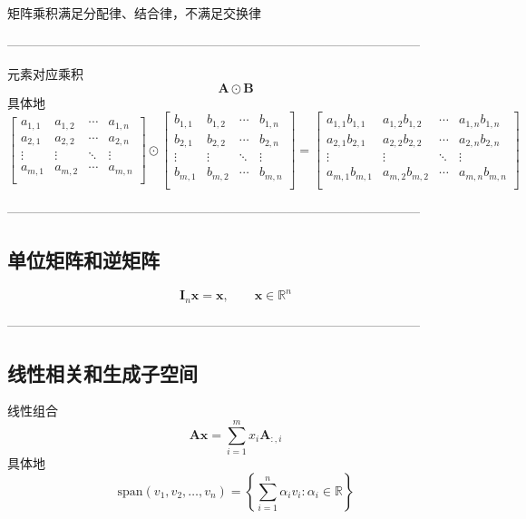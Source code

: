 \documentclass{article}
\begin{document}
矩阵乘积满足分配律、结合律，不满足交换律

--------------------------------------------------------------------------------------------------

元素对应乘积
$$
\mathbf{A} \odot \mathbf{B}
$$
具体地
$$
\begin{bmatrix}
a_{1,1} & a_{1,2} & \cdots & a_{1,n} \\
a_{2,1} & a_{2,2} & \cdots & a_{2,n} \\
\vdots & \vdots & \ddots & \vdots \\
a_{m,1} & a_{m,2} & \cdots & a_{m,n} \\
\end{bmatrix}
\odot
\begin{bmatrix}
b_{1,1} & b_{1,2} & \cdots & b_{1,n} \\
b_{2,1} & b_{2,2} & \cdots & b_{2,n} \\
\vdots & \vdots & \ddots & \vdots \\
b_{m,1} & b_{m,2} & \cdots & b_{m,n} \\
\end{bmatrix}
=
\begin{bmatrix}
a_{1,1} b_{1,1} & a_{1,2} b_{1,2} & \cdots & a_{1,n} b_{1,n} \\
a_{2,1} b_{2,1} & a_{2,2} b_{2,2} & \cdots & a_{2,n} b_{2,n} \\
\vdots & \vdots & \ddots & \vdots \\
a_{m,1} b_{m,1} & a_{m,2} b_{m,2} & \cdots & a_{m,n} b_{m,n} \\
\end{bmatrix}
$$

--------------------------------------------------------------------------------------------------

\subsection{单位矩阵和逆矩阵}
\[
\boldsymbol{I}_n\boldsymbol{x}=\boldsymbol{x}, \qquad \boldsymbol{x} \in \mathbb{R}^n
\]

--------------------------------------------------------------------------------------------------

\subsection{线性相关和生成子空间}
线性组合
$$
\mathbf{Ax} = \sum_{i=1}^{m} x_i\mathbf{A}_{:,i}
$$
具体地
\begin{equation*}
    \mathrm{span}(v_1, v_2, \dots, v_n) = \left\{ \sum_{i=1}^n \alpha_i v_i : \alpha_i \in \mathbb{R} \right\}
\end{equation*}
\end{document}
